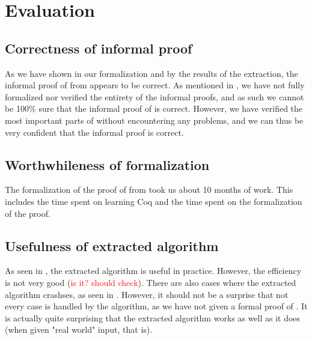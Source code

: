 \chapter{Evaluation}

\section{Correctness of informal proof}

As we have shown in our formalization and by the results of the
extraction, the informal proof of  from \cite{mbezem} appears to be correct.
As mentioned in , we have not fully formalized nor verified the entirety of the informal proofs,
and as such we cannot be 100\% sure that the informal proof of  is correct.
However, we have verified the most important parts of  without
encountering any problems, and we can thus be very confident that the informal proof is correct.

\section{Worthwhileness of formalization}

The formalization of the proof of  from \cite{mbezem} took us about 10 months of work.
This includes the time spent on learning Coq and the time spent on the formalization of the proof.

\section{Usefulness of extracted algorithm}

As seen in , the extracted algorithm is useful in practice.
However, the efficiency is not very good (\textcolor{red}{is it? should check}).
There are also cases where the extracted algorithm crashses, as seen in .
However, it should not be a surprise that not every case is handled by the algorithm,
as we have not given a formal proof of .
It is actually quite surprising that the extracted algorithm works as well as it does
(when given "real world" input, that is).

